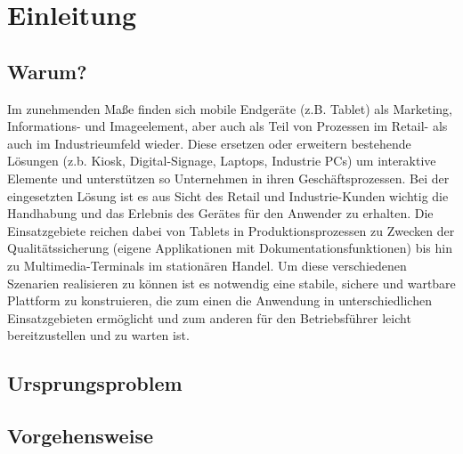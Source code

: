 \chapter{Einleitung}
\section{Warum?}
Im zunehmenden Maße finden sich mobile Endgeräte (z.B. Tablet) als Marketing, Informations- und Imageelement, aber auch als Teil von Prozessen im Retail- als auch im Industrieumfeld wieder. Diese ersetzen oder erweitern bestehende Lösungen (z.b. Kiosk, Digital-Signage, Laptops, Industrie PCs) um interaktive Elemente und unterstützen so Unternehmen in ihren Geschäftsprozessen. 
Bei der eingesetzten Lösung ist es aus Sicht des Retail und Industrie-Kunden wichtig die Handhabung und das Erlebnis des Gerätes für den Anwender zu erhalten. Die Einsatzgebiete reichen dabei von Tablets in Produktionsprozessen zu Zwecken der Qualitätssicherung (eigene Applikationen mit Dokumentationsfunktionen) bis hin zu Multimedia-Terminals im stationären Handel. Um diese verschiedenen Szenarien realisieren zu können ist es notwendig eine stabile, sichere und wartbare Plattform zu konstruieren, die zum einen die Anwendung in unterschiedlichen Einsatzgebieten ermöglicht und zum anderen für den Betriebsführer leicht bereitzustellen und zu warten ist.\cite{lastenheft}



\section{Ursprungsproblem}

\section{Vorgehensweise}
